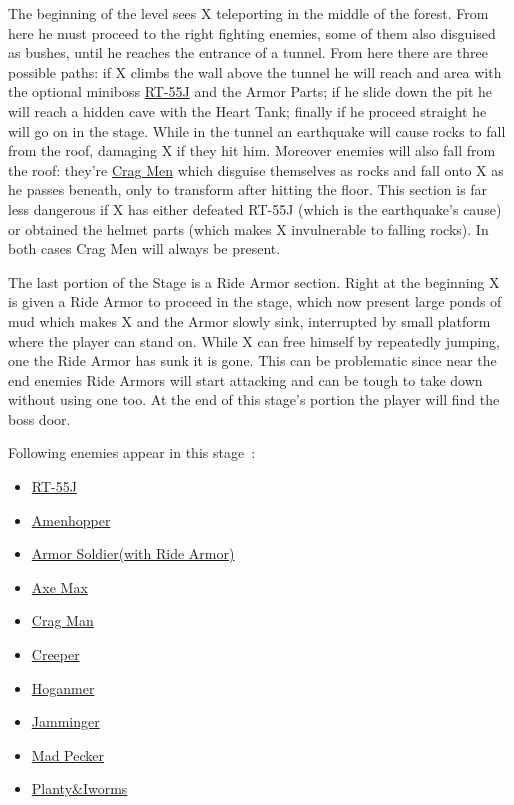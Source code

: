 The beginning of the level sees X teleporting in the middle of the forest. From here he must proceed to the right fighting enemies, some of them also disguised as bushes, until he reaches the entrance of a tunnel. From here there are three possible paths: if X climbs the wall above the tunnel he will reach and area with the optional miniboss \hyperlink{miniboss:RT-55J}{RT-55J} and the Armor Parts; if he slide down the pit he will reach a hidden cave with the Heart Tank; finally if he proceed straight he will go on in the stage. While in the tunnel an earthquake will cause rocks to fall from the roof, damaging X if they hit him. Moreover enemies will also fall from the roof: they're \hyperlink{enem:Crag_Man}{Crag Men} which disguise themselves as rocks and fall onto X as he passes beneath, only to transform after hitting the floor. This section is far less dangerous if X has either defeated RT-55J (which is the earthquake's cause) or obtained the helmet parts (which makes X invulnerable to falling rocks). In both cases Crag Men will always be present.

The last portion of the Stage is a Ride Armor section. Right at the beginning X is given a Ride Armor to proceed in the stage, which now present large ponds of mud which makes X and the Armor slowly sink, interrupted by small platform where the player can stand on. While X can free himself by repeatedly jumping, one the Ride Armor has sunk it is gone. This can be problematic since near the end enemies Ride Armors will start attacking and can be tough to take down without using one too. At the end of this stage's portion the player will find the boss door.

Following enemies appear in this stage~\cite{wiki:Forest}:
\begin{itemize}
	\item \hyperlink {miniboss:RT-55J}{RT-55J}
	\item \hyperlink {enem:Amenhopper} {Amenhopper}
	\item \hyperlink {enem:Armor_Soldier} {Armor Soldier(with Ride Armor)}
	\item \hyperlink {enem:Axe_Max} {Axe Max}
	\item \hyperlink {enem:Crag_Man} {Crag Man}
	\item \hyperlink {enem:Creeper} {Creeper}
	\item \hyperlink {enem:Hoganmer} {Hoganmer}
	\item \hyperlink {enem:Jamminger} {Jamminger}
	\item \hyperlink {enem:Mad_Pecker} {Mad Pecker}
	\item \hyperlink {enem:Planty_Iworms} {Planty\&Iworms}
\end{itemize}

